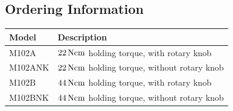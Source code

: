 \documentclass[a4paper, final, 12pt, oneside]{scrartcl}
\numberwithin{equation}{section}
\numberwithin{table}{section}
\numberwithin{figure}{section}
\begin{document}
\subsection*{Ordering Information}
\begin{table}[!hp]
  \begin{tabular}{ll}
    \toprule
    \textbf{Model} & \textbf{Description}\\
    \toprule
    M102A   & $\unit[22]{Ncm}$ holding torque, with rotary knob \\
    M102ANK & $\unit[22]{Ncm}$ holding torque, without rotary knob \\
    M102B   & $\unit[44]{Ncm}$ holding torque, with rotary knob \\
    M102BNK & $\unit[44]{Ncm}$ holding torque, without rotary knob \\
    \bottomrule
  \end{tabular}
\end{table}















\FloatBarrier
\vfill
\end{document}
